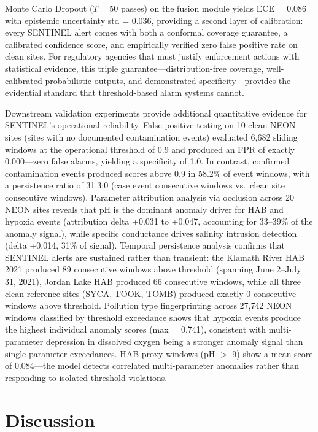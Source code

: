 \documentclass[12pt]{article}
\begin{document}
Monte Carlo Dropout ($T = 50$ passes) on the fusion module yields ECE = 0.086 with epistemic uncertainty std = 0.036, providing a second layer of calibration: every SENTINEL alert comes with both a conformal coverage guarantee, a calibrated confidence score, and empirically verified zero false positive rate on clean sites. For regulatory agencies that must justify enforcement actions with statistical evidence, this triple guarantee---distribution-free coverage, well-calibrated probabilistic outputs, and demonstrated specificity---provides the evidential standard that threshold-based alarm systems cannot.

Downstream validation experiments provide additional quantitative evidence for SENTINEL's operational reliability. False positive testing on 10 clean NEON sites (sites with no documented contamination events) evaluated 6,682 sliding windows at the operational threshold of 0.9 and produced an FPR of exactly 0.000---zero false alarms, yielding a specificity of 1.0. In contrast, confirmed contamination events produced scores above 0.9 in 58.2\% of event windows, with a persistence ratio of 31.3:0 (case event consecutive windows vs.\ clean site consecutive windows). Parameter attribution analysis via occlusion across 20 NEON sites reveals that pH is the dominant anomaly driver for HAB and hypoxia events (attribution delta +0.031 to +0.047, accounting for 33--39\% of the anomaly signal), while specific conductance drives salinity intrusion detection (delta +0.014, 31\% of signal). Temporal persistence analysis confirms that SENTINEL alerts are sustained rather than transient: the Klamath River HAB 2021 produced 89 consecutive windows above threshold (spanning June 2--July 31, 2021), Jordan Lake HAB produced 66 consecutive windows, while all three clean reference sites (SYCA, TOOK, TOMB) produced exactly 0 consecutive windows above threshold. Pollution type fingerprinting across 27,742 NEON windows classified by threshold exceedance shows that hypoxia events produce the highest individual anomaly scores (max = 0.741), consistent with multi-parameter depression in dissolved oxygen being a stronger anomaly signal than single-parameter exceedances. HAB proxy windows (pH $>$ 9) show a mean score of 0.084---the model detects correlated multi-parameter anomalies rather than responding to isolated threshold violations.

\section{Discussion}
\end{document}
